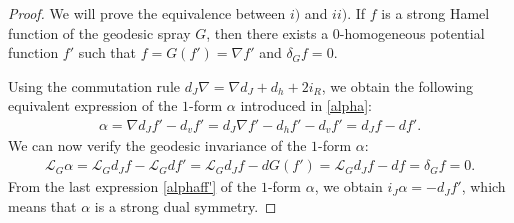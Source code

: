 \documentclass[oneside,english]{amsart}
\theoremstyle{definition}
\theoremstyle{plain}
\theoremstyle{plain}
\theoremstyle{plain}
\theoremstyle{remark}
\theoremstyle{remark}
\theoremstyle{remark}
\begin{document}
\begin{proof}
We will prove the equivalence between $i)$ and $ii)$. If $f$ is a strong Hamel function of the geodesic spray $G$, then there exists a $0$-homogeneous potential function $f'$ such that $f=G(f')=\nabla f'$ and $\delta_Gf=0$.

Using the commutation rule $d_J\nabla=\nabla d_J+d_h+2i_R$, we obtain the following equivalent expression of the $1$-form $\alpha$ introduced in \eqref{alpha}:
\begin{eqnarray}
\alpha=\nabla d_Jf'-d_vf'=d_J\nabla f'-d_hf'-d_vf'=d_Jf-df'. \label{alphaff'}
\end{eqnarray} 
We can now verify the geodesic invariance of the $1$-form $\alpha$:
\begin{eqnarray*}
\mathcal{L}_{G}\alpha=\mathcal{L}_{G}d_Jf-\mathcal{L}_{G}df'=\mathcal{L}_{G}d_Jf-dG(f')=\mathcal{L}_{G}d_Jf-df=\delta_Gf=0.
\end{eqnarray*}
From the last expression \eqref{alphaff'} of the $1$-form $\alpha$, we obtain $i_J\alpha=-d_Jf'$, which means that $\alpha$ is a strong dual symmetry.


\end{proof}
\end{document}
